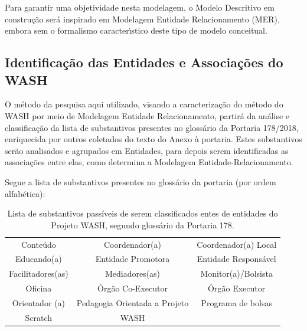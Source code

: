 \documentclass[
12pt,		%
openright,	%
twoside,  %
a4paper,			%
chapter=TITLE,		%
english,			%
french,				%
spanish,			%
brazil				%
]{USPSC-classe/USPSC_RedarTex}
\begin{document}
Para garantir uma objetividade nesta modelagem, o Modelo Descritivo em constru\c{c}\~ao ser\'a inspirado em Modelagem Entidade Relacionamento (MER), embora sem o formalismo caracter\'{\i}stico deste tipo de modelo conceitual.










\subsection[Identifica\c{c}\~ao das Entidades e Associa\c{c}\~oes do WASH]{Identifica\c{c}\~ao das Entidades e Associa\c{c}\~oes do WASH}\label{Identifica\c{c}\~ao das Entidades e Associa\c{c}\~oes do WASH}
O m\'etodo da pesquisa aqui utilizado, visando a caracteriza\c{c}\~ao do m\'etodo do WASH por meio de Modelagem Entidade Relacionamento, partir\'a da an\'alise e classifica\c{c}\~ao da lista de substantivos presentes no gloss\'ario da Portaria 178/2018, enriquecida por outros coletados do texto do Anexo \`a portaria. Estes substantivos ser\~ao analisados e agrupados em Entidades, para depois serem identificadas as associa\c{c}\~oes entre elas, como determina a Modelagem Entidade-Relacionamento.










Segue a lista de substantivos presentes no gloss\'ario da portaria (por ordem alfab\'etica):














\begin{table}[htb]
\tiny
\caption{\label{974e9891b4fe94f9cb44b52de04100c8ba1f3064}Lista de substantivos pass\'{i}veis de serem classificados entes de entidades do Projeto WASH, segundo gloss\'ario da Portaria 178.}

\centering
\begin{tabular}{|c|c|c|}
\hline
Conte\'udo  &  Coordenador(a)  &  Coordenador(a) Local \\
Educando(a)  &  Entidade Promotora  &  Entidade Respons\'avel \\
Facilitadores(as)  &  Mediadores(as)  &  Monitor(a)/Bolsista \\
Oficina  &  \'Org\~ao Co-Executor  &  \'Org\~ao Executor \\
Orientador (a)  &  Pedagogia Orientada a Projeto  & Programa de bolsas \\
Scratch  &  WASH \\
\hline
\end{tabular}
\end{table}
\end{document}

